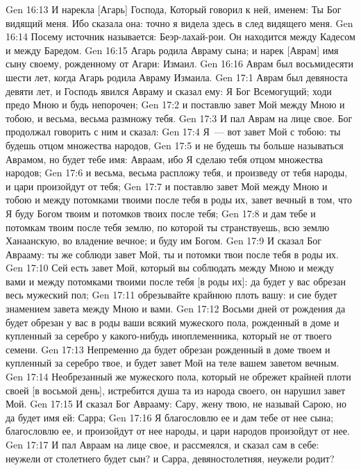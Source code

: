 \vs Gen 16:13 И нарекла [Агарь] Господа, Который говорил к ней,  именем: Ты Бог видящий меня. Ибо сказала она: точно я видела здесь в след видящего меня.
\vs Gen 16:14 Посему источник  называется: Беэр-лахай-рои. Он находится между Кадесом и между Баредом.
\rsbpar\vs Gen 16:15 Агарь родила Авраму сына; и нарек [Аврам] имя сыну своему, рожденному от Агари: Измаил.
\vs Gen 16:16 Аврам был восьмидесяти шести лет, когда Агарь родила Авраму Измаила.
\vs Gen 17:1 Аврам был девяноста девяти лет, и Господь явился Авраму и сказал ему: Я Бог Всемогущий; ходи предо Мною и будь непорочен;
\vs Gen 17:2 и поставлю завет Мой между Мною и тобою, и весьма, весьма размножу тебя.
\vs Gen 17:3 И пал Аврам на лице свое. Бог продолжал говорить с ним и сказал:
\vs Gen 17:4 Я~--- вот завет Мой с тобою: ты будешь отцом множества народов,
\vs Gen 17:5 и не будешь ты больше называться Аврамом, но будет тебе имя: Авраам, ибо Я сделаю тебя отцом множества народов;
\vs Gen 17:6 и весьма, весьма распложу тебя, и произведу от тебя народы, и цари произойдут от тебя;
\vs Gen 17:7 и поставлю завет Мой между Мною и тобою и между потомками твоими после тебя в роды их, завет вечный в том, что Я буду Богом твоим и потомков твоих после тебя;
\vs Gen 17:8 и дам тебе и потомкам твоим после тебя землю, по которой ты странствуешь, всю землю Ханаанскую, во владение вечное; и буду им Богом.
\vs Gen 17:9 И сказал Бог Аврааму: ты же соблюди завет Мой, ты и потомки твои после тебя в роды их.
\vs Gen 17:10 Сей есть завет Мой, который вы  соблюдать между Мною и между вами и между потомками твоими после тебя [в роды их]: да будет у вас обрезан весь мужеский пол;
\vs Gen 17:11 обрезывайте крайнюю плоть вашу: и сие будет знамением завета между Мною и вами.
\vs Gen 17:12 Восьми дней от рождения да будет обрезан у вас в роды ваши всякий  мужеского пола, рожденный в доме и купленный за серебро у какого-нибудь иноплеменника, который не от твоего семени.
\vs Gen 17:13 Непременно да будет обрезан рожденный в доме твоем и купленный за серебро твое, и будет завет Мой на теле вашем заветом вечным.
\vs Gen 17:14 Необрезанный же мужеского пола, который не обрежет крайней плоти своей [в восьмой день], истребится душа та из народа своего,  он нарушил завет Мой.
\vs Gen 17:15 И сказал Бог Аврааму: Сару, жену твою, не называй Сарою, но да будет имя ей: Сарра;
\vs Gen 17:16 Я благословлю ее и дам тебе от нее сына; благословлю ее, и произойдут от нее народы, и цари народов произойдут от нее.
\vs Gen 17:17 И пал Авраам на лице свое, и рассмеялся, и сказал сам в себе: неужели от столетнего будет сын? и Сарра, девяностолетняя, неужели родит?
